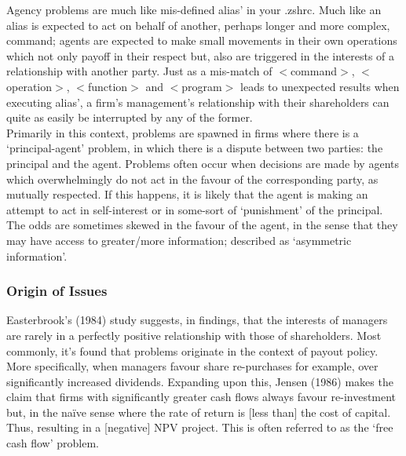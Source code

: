 \documentclass[11pt, english]{article}
\begin{document}
	Agency problems are much like mis-defined alias’ in your .zshrc. Much like an alias is expected to act on behalf of another, perhaps longer and more complex, command; agents are expected to make small movements in their own operations which not only payoff in their respect but, also are triggered in the interests of a relationship with another party. Just as a mis-match of $<$command$>$, $<$operation$>$, $<$function$>$ and $<$program$>$ leads to unexpected results when executing alias’, a firm’s management’s relationship with their shareholders can quite as easily be interrupted by any of the former.\\

	Primarily in this context, problems are spawned in firms where there is a `principal-agent' problem, in which there is a dispute between two parties: the principal and the agent. Problems often occur when decisions are made by agents which overwhelmingly do not act in the favour of the corresponding party, as mutually respected. If this happens, it is likely that the agent is making an attempt to act in self-interest or in some-sort of `punishment' of the principal. The odds are sometimes skewed in the favour of the agent, in the sense that they may have access to greater/more information; described as `asymmetric information'.

		\subsubsection*{Origin of Issues}

	Easterbrook’s (1984) study suggests, in findings, that the interests of managers are rarely in a perfectly positive relationship with those of shareholders. Most commonly, it’s found that problems originate in the context of payout policy. More specifically, when managers favour share re-purchases for example, over significantly increased dividends. Expanding upon this, Jensen (1986) makes the claim that firms with significantly greater cash flows always favour re-investment but, in the naïve sense where the rate of return is [less than] the cost of capital. Thus, resulting in a [negative] NPV project. This is often referred to as the ‘free cash flow’ problem.\\
\end{document}
